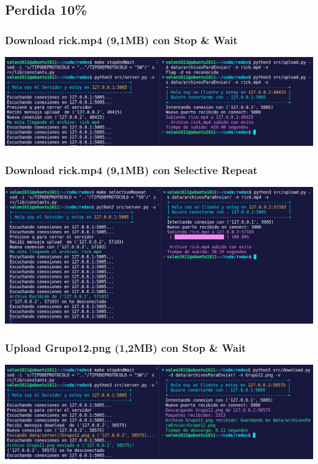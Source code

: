 \documentclass{article}
\begin{document}
\subsection{Perdida 10\%}

\subsubsection{Download rick.mp4 (9,1MB) con Stop \& Wait}
\begin{center}
\includegraphics[scale=0.35]{conPerdidaUploadrick.mp4(9,1MB)conStopWait}
\end{center}
\subsubsection{Download rick.mp4 (9,1MB) con Selective Repeat}
\begin{center}
\includegraphics[scale=0.35]{conPerdidaUploadrick.mp4(9,1MB)conSelectiveRepeat}
\end{center}
\subsubsection{Upload Grupo12.png (1,2MB) con Stop \& Wait}
\begin{center}
\includegraphics[scale=0.35]{DownloadGrupo12.png(1,2MB)conStopWait}
\end{center}
\end{document}
